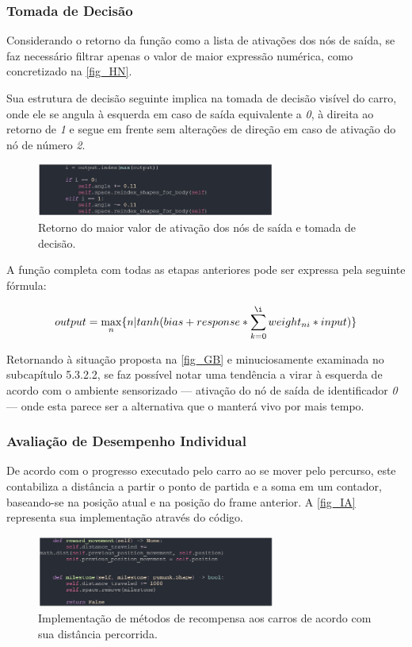\subsubsection{Tomada de Decisão}
Considerando o retorno da função como a lista de ativações dos nós de saída, se faz necessário filtrar
apenas o valor de maior expressão numérica, como concretizado na \autoref{fig_HN}.

Sua estrutura de decisão seguinte implica na tomada de decisão visível do carro, onde ele se angula
à esquerda em caso de saída equivalente a \textit{0}, à direita ao retorno de \textit{1} e segue em frente sem alterações
de direção em caso de ativação do nó de número \textit{2}.

\begin{figure}[htb]
        \centering
        \caption{\label{fig_HN}Retorno do maior valor de ativação dos nós de saída e tomada de decisão.}
        \includegraphics[width=0.7\textwidth]{images/HN.png}
\end{figure}

A função completa com todas as etapas anteriores pode ser expressa pela seguinte fórmula:

\[ output = \max_{n}\{n | tanh(bias + response * \sum_{k=0}^{\i} weight_{ni}*input)\} \]

Retornando à situação proposta na \autoref{fig_GB} e minuciosamente examinada no subcapítulo 5.3.2.2,
se faz possível notar uma tendência a virar à esquerda de acordo com o ambiente sensorizado —
ativação do nó de saída de identificador \textit{0} — onde esta parece ser a alternativa que o manterá vivo por mais tempo.

\subsubsection{Avaliação de Desempenho Individual}
De acordo com o progresso executado pelo carro ao se mover pelo percurso, este contabiliza a
distância a partir o ponto de partida e a soma em um contador, baseando-se na posição atual e na
posição do frame anterior. A \autoref{fig_IA} representa sua implementação através do código.

\begin{figure}[htb]
        \centering
        \caption{\label{fig_IA}Implementação de métodos de recompensa aos carros de acordo com sua distância percorrida.}
        \includegraphics[width=0.7\textwidth]{images/IA.png}
\end{figure}

